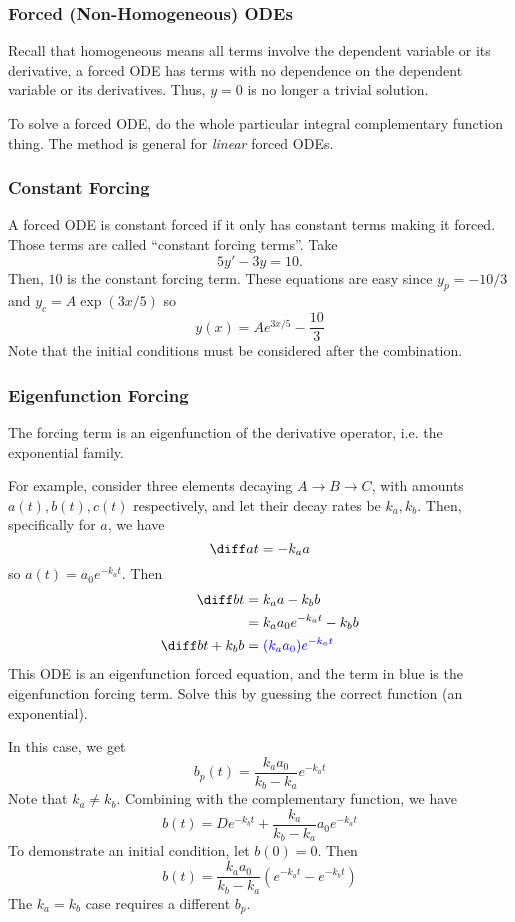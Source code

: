 \documentclass[12pt]{article}
\begin{document}
\subsubsection{Forced (Non-Homogeneous) ODEs}

Recall that homogeneous means all terms involve 
the dependent variable or its derivative,
a forced ODE has terms with no dependence on 
the dependent variable or its derivatives.
Thus, $y=0$ is no longer a trivial solution.

To solve a forced ODE, do the whole
particular integral complementary function thing.
The method is general for \emph{linear} forced ODEs.

\subsubsection*{Constant Forcing}

A forced ODE is constant forced if it only
has constant terms making it forced.
Those terms are called ``constant forcing terms''.
Take
\[
5y'-3y=10.
\]
Then, $10$ is the constant forcing term.
These equations are easy since $y_p = -10/3$ and $y_c = A\exp(3x/5)$ so
\[
y(x) = Ae^{3x/5} - \frac{10}{3}
\]
Note that the initial conditions must be considered
after the combination.

\subsubsection*{Eigenfunction Forcing}

The forcing term is an eigenfunction of the
derivative operator, i.e. the exponential family.

For example, consider three elements
decaying $A \to B \to C$, with
amounts $a(t),b(t),c(t)$ respectively,
and let their decay rates be $k_a,k_b$.
Then, specifically for $a$, we have
\[
\diff at = -k_a a
\]
so $a(t) = a_0 e^{-k_a t}$. Then
\begin{align*}
    \diff bt 
    &= k_a a - k_b b\\
    &= k_a a_0 e^{-k_a t} - k_b b\\
    \diff bt + k_b b
    &= \mathcolor{blue}{(k_a a_{0}) e^{-k_a t}}
\end{align*}
This ODE is an eigenfunction forced equation,
and the term in blue is the eigenfunction forcing term.
Solve this by guessing the correct function (an exponential).

In this case, we get
\[
b_p(t) = \frac{k_a a_{0}}{k_b - k_a} e^{-k_a t}
\]
Note that $k_a \ne k_b$. Combining with the complementary function, we have
\[
b(t) = De^{-k_b t} + \frac{k_a}{k_b - k_a} a_{0} e^{-k_a t}
\]
To demonstrate an initial condition, let $b(0) = 0$. Then
\[
b(t) = \frac{k_a a_{0}}{k_b - k_a}\left(e^{-k_a t}-e^{-k_b t}\right)
\]
The $k_a = k_b$ case requires a different $b_p$.
\end{document}
